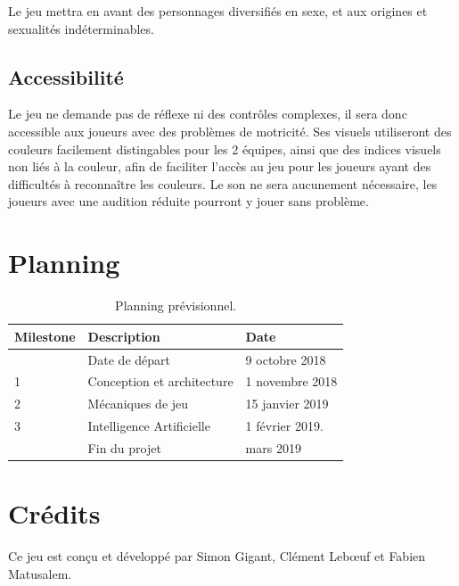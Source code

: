 \documentclass[a4paper]{scrreprt}
\begin{document}
Le jeu mettra en avant des personnages diversifiés en sexe, et aux origines et sexualités indéterminables.

\section{Accessibilité}
Le jeu ne demande pas de réflexe ni des contrôles complexes, il sera donc accessible aux joueurs avec des problèmes de motricité.
Ses visuels utiliseront des couleurs facilement distingables pour les 2 équipes, ainsi que des indices visuels non liés à la couleur, afin de faciliter l'accès au jeu pour les joueurs ayant des difficultés à reconnaître les couleurs.
Le son ne sera aucunement nécessaire, les joueurs avec une audition réduite pourront y jouer sans problème.



\chapter{Planning}

\begin{table}[h]
\centering
\begin{tabular}{|l|l|l|}
\hline
Milestone & Description & Date \\\hline
& Date de départ & 9 octobre 2018 \\
1 & Conception et architecture  & 1 novembre 2018 \\
2 & Mécaniques de jeu & 15 janvier 2019\\
3 & Intelligence Artificielle & 1 février 2019. \\
& Fin du projet & mars 2019 \\
\hline
\end{tabular}
\caption{\label{tab:schedule}Planning prévisionnel.}
\end{table}




\chapter{Crédits}

Ce jeu est conçu et développé par Simon Gigant, Clément Leb\oe uf et Fabien Matusalem.


%
%
\end{document}
